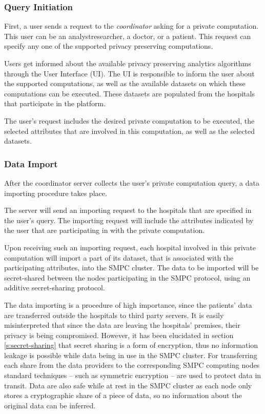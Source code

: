 \subsubsection{Query Initiation}\label{sss:query-initiation}
First, a user sends a request to the \textit{coordinator} asking for a private computation.
This user can be an analyst\myslash researcher, a doctor, or a patient.
This request can specify any one of the supported privacy preserving computations.

Users get informed about the available privacy preserving analytics algorithms through the User Interface (UI).
The UI is responsible to inform the user about the supported computations, as well as the available datasets on which these computations can be executed.
These datasets are populated from the hospitals that participate in the platform.

The user's request includes the desired private computation to be executed, the selected attributes that are involved in this computation, as well as the selected datasets.


\subsubsection{Data Import}\label{sss:data-import}
After the coordinator server collects the user's private computation query, a data importing procedure takes place.

The server will send an importing request to the hospitals that are specified in the user's query.
The importing request will include the attributes indicated by the user that are participating in with the private computation.

Upon receiving such an importing request, each hospital involved in this private computation will import a part of its dataset, that is associated with the participating attributes, into the SMPC cluster.
The data to be imported will be secret\hyp shared between the nodes participating in the SMPC protocol, using an additive secret\hyp sharing protocol.

The data importing is a procedure of high importance, since the patients' data are transferred outside the hospitals to third party servers.
It is easily misinterpreted that since the data are leaving the hospitals' premises, their privacy is being compromised.
However, it has been elucidated in section \ref{s:secret-sharing} that secret sharing is a form of encryption, thus no information leakage is possible while data being in use in the SMPC cluster.
For transferring each share from the data providers to the corresponding SMPC computing nodes standard techniques -- such as symmetric encryption -- are used to protect data in transit.
Data are also safe while at rest in the SMPC cluster as each node only stores a cryptographic share of a piece of data, so no information about the original data can be inferred.

